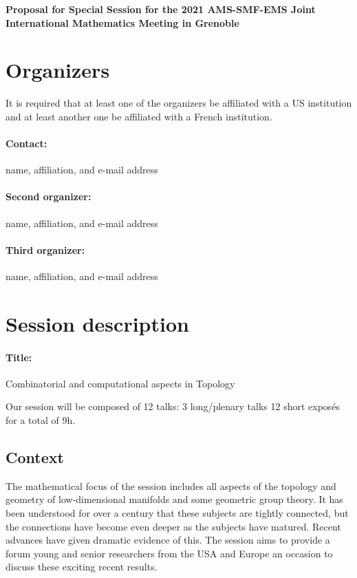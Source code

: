 \documentclass[12pt,fleqn]{article}
\begin{document}
\begin{center}
{\huge \bf Proposal for Special Session
for the 2021 AMS-SMF-EMS Joint International Mathematics Meeting in Grenoble
}
\end{center}
\smallskip

\section{Organizers}
It is required that at least one of the organizers be affiliated with a US institution
and at least another one be affiliated with a French institution.

\paragraph{Contact:} name, affiliation, and e-mail address

\paragraph{Second organizer:} name, affiliation, and e-mail address

\paragraph{Third organizer:} name, affiliation, and e-mail address


\section{Session description}

\paragraph{Title:} {\large Combinatorial and computational aspects in Topology}

Our session will be composed of 12 talks: 
3 long/plenary talks 12 short exposés for a total of 9h.

\subsection{Context}

The mathematical focus of the session includes all aspects of the topology and geometry of low-dimensional manifolds and some geometric group theory. It has been understood for over a century that these subjects are tightly connected, but the connections have become even deeper as the subjects have matured. Recent advances have given dramatic evidence of this. The session aims to provide a forum  young and senior researchers from the USA and Europe an occasion to discuss these exciting recent results.
\end{document}
